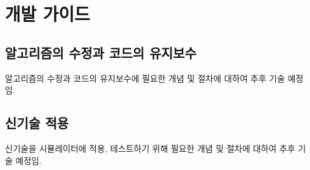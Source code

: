 \part{개발 가이드}
\label{part:module}


\chapter{알고리즘의 수정과 코드의 유지보수}

알고리즘의 수정과 코드의 유지보수에 필요한 개념 및 절차에 대하여 추후 기술 예정임.


\chapter{신기술 적용}

신기술을 시뮬레이터에 적용, 테스트하기 위해 필요한 개념 및 절차에 대하여 추후 기술 예정임.